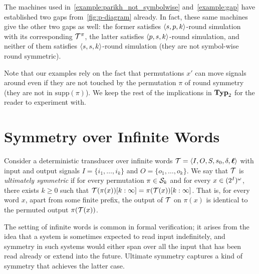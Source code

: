 The machines used in~\cref{example:parikh_not_symbolwise} and~\cref{example:gap} have established two gaps from~\cref{fig:p-diagram} already. In fact, these same machines give the other two gaps as well: the former satisfies $\left< s,p,k\right>$-round simulation with its corresponding $\mathcal{T}^\pi$, the latter satisfies $\left< p,s,k\right>$-round simulation, and neither of them satisfies $\left< s,s,k\right>$-round simulation (they are not symbol-wise round symmetric).

Note that our examples rely on the fact that permutations $x'$ can move signals around even if they are not touched by the permutation $\pi$ of round symmetry (they are not in $\mathrm{supp}(\pi)$). We keep the rest of the implications in $\mathbf{Typ}_2$ for the reader to experiment with.

\section{Symmetry over Infinite Words}

Consider a deterministic transducer over infinite words $\mathcal{T}=\left< I,O,S,s_0,\delta,\boldsymbol{\ell}\right>$ with input and output signals $I=\{i_1,\ldots,i_k\}$ and $O=\{o_1,\ldots,o_k\}$. We say that $\mathcal{T}$ is \emph{ultimately symmetric} if for every permutation $\pi\in \mathcal{S}_k$ and for every $x\in (2^{I})^\omega$, there exists $k\ge 0$ such that $\mathcal{T}(\pi(x))[k:\infty]=\pi(\mathcal{T}(x))[k:\infty]$. That is, for every word $x$, apart from some finite prefix, the output of $\mathcal{T}$ on $\pi(x)$ is identical to the permuted output $\pi(\mathcal{T}(x))$.

The setting of infinite words is common in formal verification; it arises from the idea that a system is sometimes expected to read input indefinitely, and symmetry in such systems would either span over all the input that has been read already or extend into the future. Ultimate symmetry captures a kind of symmetry that achieves the latter case.

